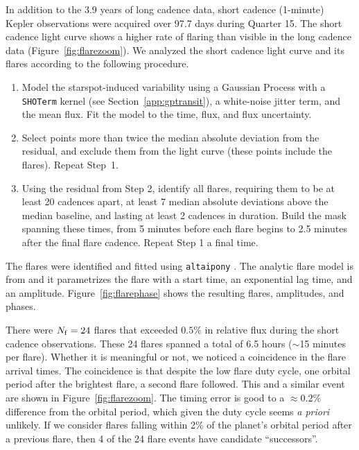\documentclass[12pt,modern,twocolumn,tighten]{aastex63}
\begin{document}
In addition to the 3.9 years of long cadence data, short cadence
(1-minute) Kepler observations were acquired over 97.7 days during
Quarter 15.  The short cadence light curve shows a higher rate of
flaring than visible in the long cadence data
(Figure~\ref{fig:flarezoom}).  We analyzed the short cadence light
curve and its flares according to the following procedure.
\begin{enumerate}
  \item Model the starspot-induced variability using a
    Gaussian Process with a \texttt{SHOTerm} kernel (see
    Section~\ref{app:gptransit}), a white-noise jitter term, and the
    mean flux.  Fit the model to the time, flux, and flux uncertainty.
  \item Select points more than twice the median absolute
    deviation from the residual, and exclude them from the light
    curve (these points include the flares).  Repeat Step~1.
  \item Using the residual from Step 2, identify all flares,
    requiring them to be at least 20 cadences apart, at least 7 median
    absolute deviations above the median baseline, and lasting at
    least 2 cadences in duration.  Build the mask spanning these
    times, from 5 minutes before each flare begins to 2.5 minutes
    after the final flare cadence.  Repeat Step 1 a final time.
\end{enumerate}
The flares were identified and fitted using \texttt{altaipony}
\citep{davenport_2016,ilin_flares_2021}.  The analytic flare model is
from \citet{davenport_2014} and it parametrizes the flare with a start
time, an exponential lag time, and an amplitude.
Figure~\ref{fig:flarephase} shows the resulting flares, amplitudes,
and phases.

There were $N_{\rm f}=24$ flares that exceeded $0.5\%$ in relative
flux during the short cadence observations.  These 24 flares spanned a
total of 6.5 hours ($\sim$15 minutes per flare).  Whether it is
meaningful or not, we noticed a coincidence in the flare arrival
times.  The coincidence is that despite the low flare duty cycle, one
orbital period after the brightest flare, a second flare followed.
This and a similar event are shown in Figure~\ref{fig:flarezoom}.  The
timing error is good to a $\approx0.2\%$ difference from the orbital
period, which given the duty cycle seems {\it a priori} unlikely.  If
we consider flares falling within 2\% of the planet's orbital period
after a previous flare, then 4 of the 24 flare events have candidate
``successors''.
\end{document}
